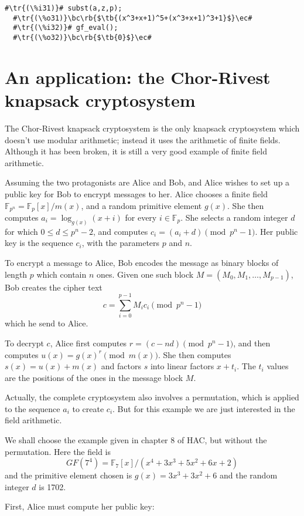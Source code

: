 \documentclass[a4paper,11pt,leqno,fleqn]{artikel3}
\newcommand{\bc}{\begin{center}}
\newcommand{\ec}{\end{center}}
\newcommand{\tr}[1]{\textcolor{red}{#1}}
\newcommand{\tb}[1]{\textcolor{blue}{#1}}
\newcommand{\rb}[1]{\raisebox{2mm}[0mm][1mm]{#1}}
\begin{document}
\begin{lstlisting}[escapechar=\#]
  #\tr{(\%i31)}# subst(a,z,p);
  #\tr{(\%o31)}\bc\rb{$\tb{(x^3+x+1)^5+(x^3+x+1)^3+1}$}\ec#
  #\tr{(\%i32)}# gf_eval();
  #\tr{(\%o32)}\bc\rb{$\tb{0}$}\ec#
\end{lstlisting}

\section*{An application: the Chor-Rivest knapsack cryptosystem}

The Chor-Rivest knapsack cryptosystem is the only knapsack cryptosystem which
doesn't use modular arithmetic; instead it uses the arithmetic of finite
fields.  Although it has been broken, it is still a very good example of
finite field arithmetic.

Assuming the two protagonists are Alice and Bob, and Alice wishes to set up a
public key for Bob to encrypt messages to her.  Alice chooses a finite field
$\mathbb{F}_{p^n}=\mathbb{F}_p[x]/m(x)$, and a random primitive element $g(x)$.  She
then computes $a_i=\log_{g(x)}(x+i)$ for every $i\in\mathbb{F}_p$.  She
selects a random integer $d$ for which $0\le d\le p^n-2$, and computes
$c_i=(a_i+d)\pmod{p^n-1}$.  Her public key is the sequence $c_i$, with the
parameters $p$ and $n$.

To encrypt a message to Alice, Bob encodes the message as binary blocks of
length $p$ which contain $n$ ones.  Given one such block
$M=(M_0,M_1,\ldots,M_{p-1})$, Bob creates the cipher text
\[
c=\sum_{i=0}^{p-1}M_ic_i\pmod{p^n-1}
\]
which he send to Alice.

To decrypt $c$, Alice first computes $r=(c-nd)\pmod{p^n-1}$, and then computes
$u(x)=g(x)^r\pmod{m(x)}$.  She then computes $s(x)=u(x)+m(x)$ and factors $s$
into linear factors $x+t_i$.  The $t_i$ values are the positions of the ones
in the message block $M$.

Actually, the complete cryptosystem also involves a permutation, which is
applied to the sequence $a_i$ to create $c_i$.  But for this example we are
just interested in the field arithmetic.

We shall choose the example given in chapter 8 of HAC, but without the
permutation.  Here the field is
\[
GF(7^4)=\mathbb{F}_7[x]/(x^4+3x^3+5x^2+6x+2)
\]
and the primitive element chosen is $g(x)=3x^3+3x^2+6$ and the random integer
$d$ is 1702.

First, Alice must compute her public key:
\end{document}
